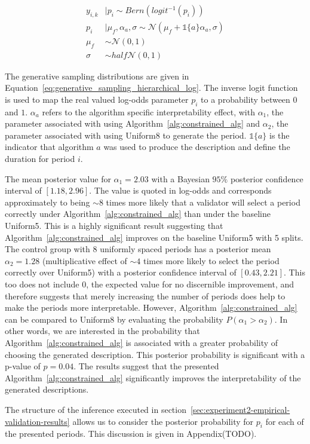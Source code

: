 \begin{equation}\label{eq:generative_sampling_hierarchical_log}
  \begin{split}
    y_{i,k} &\mid p_i \sim Bern(logit^{-1}(p_i)) \\
    p_i &\mid \mu_f,\alpha_a,\sigma \sim \mathcal{N}(\mu_f + \mathbb{1}\{a\} \alpha_a, \sigma ) \\
    \mu_f &\sim \mathcal{N}(0,1) \\
    \sigma &\sim half\mathcal{N}(0,1)
  \end{split}
\end{equation}

The generative sampling distributions are given in Equation~\ref{eq:generative_sampling_hierarchical_log}. The inverse logit function is used to map the real valued log-odds parameter $p_i$ to a probability between $0$ and $1$. $\alpha_a$ refers to the algorithm specific interpretability effect, with $\alpha_1$, the parameter associated with using Algorithm~\ref{alg:constrained_alg} and $\alpha_2$, the parameter associated with using Uniform8 to generate the period. $\mathbb{1}\{a\}$ is the indicator that algorithm $a$ was used to produce the description and define the duration for period $i$.

The mean posterior value for $\alpha_1 = 2.03$ with a Bayesian $95\%$ posterior confidence interval of $[1.18, 2.96]$. The value is quoted in log-odds and corresponds approximately to being $\sim 8$ times more likely that a validator will select a period correctly under Algorithm~\ref{alg:constrained_alg} than under the baseline Uniform5. This is a highly significant result suggesting that Algorithm~\ref{alg:constrained_alg} improves on the baseline Uniform5 with 5 splits. The control group with 8 uniformly spaced periods has a posterior mean $\alpha_2 = 1.28$ (multiplicative effect of $\sim 4$ times more likely to select the period correctly over Uniform5) with a posterior confidence interval of $[0.43, 2.21]$. This too does not include $0$, the expected value for no discernible improvement, and therefore suggests that merely increasing the number of periods does help to make the periods more interpretable. However, Algorithm~\ref{alg:constrained_alg} can be compared to Uniform8 by evaluating the probability $P(\alpha_1 > \alpha_2)$. In other words, we are interested in the probability that Algorithm~\ref{alg:constrained_alg} is associated with a greater probability of choosing the generated description. This posterior probability is significant with a p-value of $p = 0.04$. The results suggest that the presented Algorithm~\ref{alg:constrained_alg} significantly improves the interpretability of the generated descriptions.

The structure of the inference executed in section~\ref{sec:experiment2-empirical-validation-results} allows us to consider the posterior probability for $p_i$ for each of the presented periods. This discussion is given in Appendix(TODO).%
